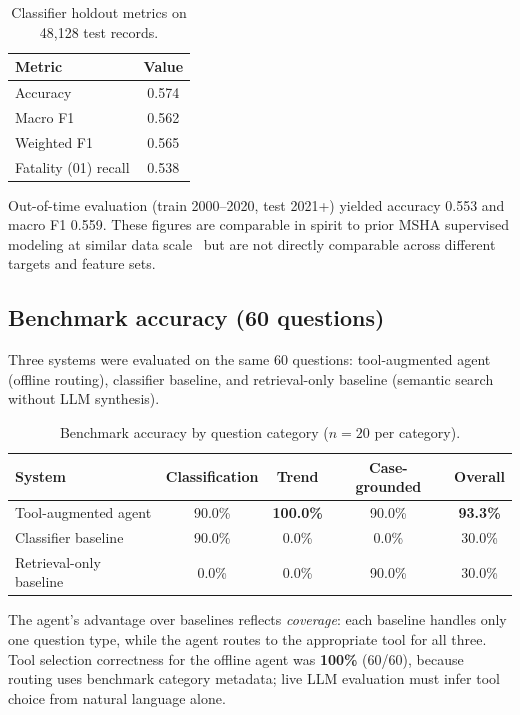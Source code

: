 \documentclass[11pt,a4paper]{article}
\begin{document}
\begin{table}[htbp]
  \centering
  \caption{Classifier holdout metrics on 48{,}128 test records.}
  \label{tab:classifier}
  \begin{tabular}{@{}lc@{}}
    \toprule
    Metric & Value \\
    \midrule
    Accuracy & 0.574 \\
    Macro F1 & 0.562 \\
    Weighted F1 & 0.565 \\
    Fatality (01) recall & 0.538 \\
    \bottomrule
  \end{tabular}
\end{table}

Out-of-time evaluation (train 2000--2020, test 2021+) yielded accuracy 0.553
and macro F1 0.559. These figures are comparable in spirit to prior MSHA
supervised modeling at similar data scale~\cite{Yedla2020} but are not directly
comparable across different targets and feature sets.

\subsection{Benchmark accuracy (60 questions)}

Three systems were evaluated on the same 60 questions: tool-augmented agent
(offline routing), classifier baseline, and retrieval-only baseline (semantic
search without LLM synthesis).

\begin{table}[htbp]
  \centering
  \caption{Benchmark accuracy by question category ($n=20$ per category).}
  \label{tab:benchmark}
  \begin{tabular}{@{}lcccc@{}}
    \toprule
    System & Classification & Trend & Case-grounded & Overall \\
    \midrule
    Tool-augmented agent & 90.0\% & \textbf{100.0\%} & 90.0\% & \textbf{93.3\%} \\
    Classifier baseline & 90.0\% & 0.0\% & 0.0\% & 30.0\% \\
    Retrieval-only baseline & 0.0\% & 0.0\% & 90.0\% & 30.0\% \\
    \bottomrule
  \end{tabular}
\end{table}

The agent's advantage over baselines reflects \emph{coverage}: each baseline
handles only one question type, while the agent routes to the appropriate tool
for all three. Tool selection correctness for the offline agent was
\textbf{100\%} (60/60), because routing uses benchmark category metadata; live
LLM evaluation must infer tool choice from natural language alone.
\end{document}
